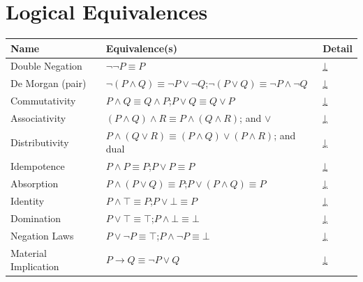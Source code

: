 
\section{Logical Equivalences}

\begin{tcolorbox}[colback=gray!6, colframe=gray!40, arc=2pt,
  left=6pt, right=6pt, top=4pt, bottom=4pt,
  title={\small\textbf{Logical Equivalences — Quick Reference}},
  fonttitle=\small\bfseries]
\small
\begin{tabular}{l l l}
\toprule
\textbf{Name} & \textbf{Equivalence(s)} & \textbf{Detail} \\
\midrule
Double Negation      & $\neg\neg P \equiv P$ & \hyperref[eq:double-neg]{↓} \\
De Morgan (pair)     & $\neg(P\wedge Q)\equiv\neg P\vee\neg Q$;\quad $\neg(P\vee Q)\equiv\neg P\wedge\neg Q$ & \hyperref[eq:demorgan]{↓} \\
Commutativity        & $P\wedge Q\equiv Q\wedge P$;\quad $P\vee Q\equiv Q\vee P$ & \hyperref[eq:comm]{↓} \\
Associativity        & $(P\wedge Q)\wedge R\equiv P\wedge(Q\wedge R)$;\; and $\vee$ & \hyperref[eq:assoc]{↓} \\
Distributivity       & $P\wedge(Q\vee R)\equiv(P\wedge Q)\vee(P\wedge R)$;\; and dual & \hyperref[eq:dist]{↓} \\
Idempotence          & $P\wedge P\equiv P$;\quad $P\vee P\equiv P$ & \hyperref[eq:idemp]{↓} \\
Absorption           & $P\wedge(P\vee Q)\equiv P$;\quad $P\vee(P\wedge Q)\equiv P$ & \hyperref[eq:absorb]{↓} \\
Identity             & $P\wedge\top\equiv P$;\quad $P\vee\bot\equiv P$ & \hyperref[eq:identity]{↓} \\
Domination           & $P\vee\top\equiv\top$;\quad $P\wedge\bot\equiv\bot$ & \hyperref[eq:domination]{↓} \\
Negation Laws        & $P\vee\neg P\equiv\top$;\quad $P\wedge\neg P\equiv\bot$ & \hyperref[eq:negation]{↓} \\
Material Implication & $P\rightarrow Q\equiv\neg P\vee Q$ & \hyperref[eq:mat-impl]{↓} \\

\end{tabular}
\end{tcolorbox}
